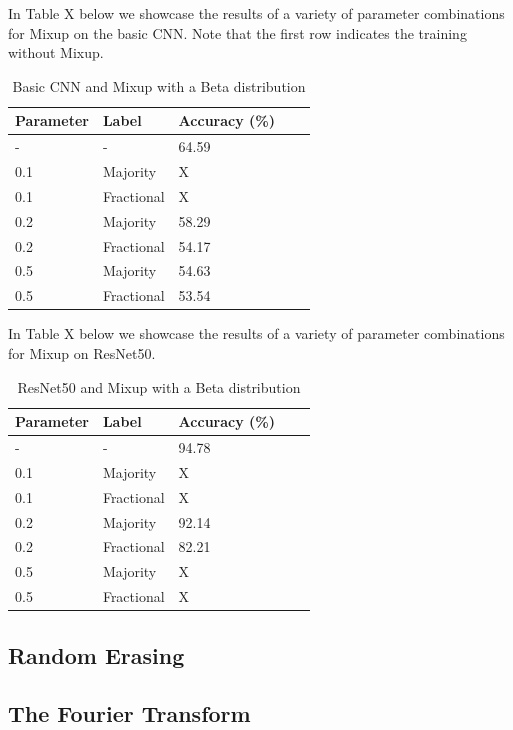 \documentclass{article}
\begin{document}
In Table X below we showcase the results of a variety of parameter combinations for Mixup on the basic CNN. Note that the first row indicates the training without Mixup.
\begin{table}[H]
	\caption{Basic CNN and Mixup with a Beta distribution}
	\label{sample-table}
	\centering
	\begin{tabular}{lllll}
		\toprule
		Parameter & Label & Accuracy (\%) \\
		\midrule
		 - & - & 64.59  \\
		 0.1 & Majority & X \\
		 0.1 & Fractional & X \\ 
		 0.2 & Majority & 58.29 \\
		 0.2 & Fractional & 54.17 \\ 
		 0.5 & Majority & 54.63 \\
		 0.5 & Fractional & 53.54 \\
		\bottomrule
	\end{tabular}
\end{table}

In Table X below we showcase the results of a variety of parameter combinations for Mixup on ResNet50.

\begin{table}[H]
	\caption{ResNet50 and Mixup with a Beta distribution}
	\label{sample-table}
	\centering
	\begin{tabular}{lllll}
		\toprule
		Parameter & Label & Accuracy (\%) \\
		\midrule
		 - & - & 94.78  \\
		 0.1 & Majority & X \\
		 0.1 & Fractional & X \\ 
		 0.2 & Majority & 92.14 \\
		 0.2 & Fractional & 82.21 \\ 
		 0.5 & Majority & X \\
		 0.5 & Fractional & X \\
		\bottomrule
	\end{tabular}
\end{table}

\subsection{Random Erasing}

\subsection{The Fourier Transform}
\end{document}
